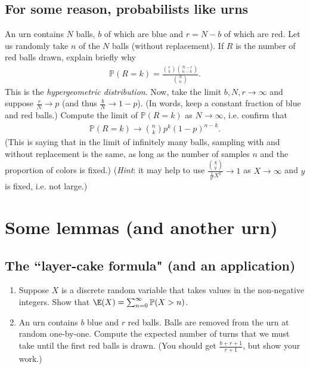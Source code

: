 \documentclass[12pt,reqno]{amsart}
\theoremstyle{definition}
\theoremstyle{remark}
\numberwithin{equation}{section}
\begin{document}
\subsection{For some reason, probabilists like urns}
An urn contains $N$ balls, $b$ of which are blue and $r=N-b$ of which are red. Let us randomly take $n$ of the $N$ balls (without replacement). If $R$ is the number of red balls drawn, explain briefly why
%
\begin{align*}
\mathbb{P}(R=k)=\frac{\binom{r}{k}\binom{N-r}{n-k}}{\binom{N}{n}}.
\end{align*}
%
This is the \emph{hypergeometric distribution}. Now, take the limit $b,N,r\to\infty$ and suppose $\frac{r}{N}\to p$ (and thus $\frac{b}{N}\to 1-p$). (In words, keep a constant fraction of blue and red balls.) Compute the limit of $\mathbb{P}(R=k)$ as $N\to\infty$, i.e. confirm that
%
\begin{align}
\mathbb{P}(R=k)\to\binom{n}{k}p^{k}(1-p)^{n-k}.
\end{align}
%
(This is saying that in the limit of infinitely many balls, sampling with and without replacement is the same, as long as the number of samples $n$ and the proportion of colors is fixed.) (\emph{Hint}: it may help to use $\frac{\binom{X}{y}}{\frac{1}{y!}X^{y}}\to1$ as $X\to\infty$ and $y$ is fixed, i.e. not large.)
%
%
%
\section{Some lemmas (and another urn)}
\subsection{The ``layer-cake formula" (and an application)}
\begin{enumerate}
\item Suppose $X$ is a discrete random variable that takes values in the non-negative integers. Show that $\E(X)=\sum_{n=0}^{\infty}\mathbb{P}(X>n)$.
\item An urn contains $b$ blue and $r$ red balls. Balls are removed from the urn at random one-by-one. Compute the expected number of turns that we must take until the first red balls is drawn. (You should get $\frac{b+r+1}{r+1}$, but show your work.)
\end{enumerate}
\end{document}
